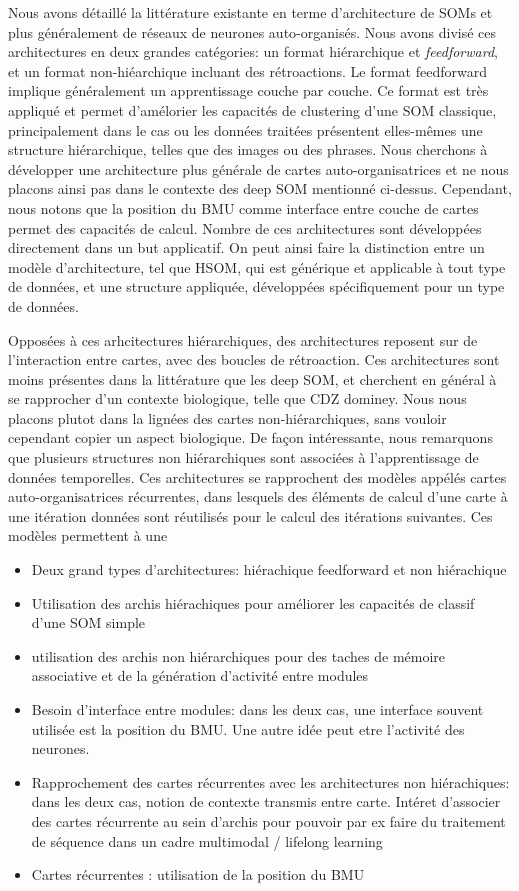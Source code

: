 \documentclass[../main]{subfiles}
\begin{document}
Nous avons détaillé la littérature existante en terme d'architecture de SOMs et plus généralement de réseaux de neurones auto-organisés. Nous avons divisé ces architectures en deux grandes catégories: un format hiérarchique et \emph{feedforward}, et un format non-hiéarchique incluant des rétroactions.
Le format feedforward implique généralement un apprentissage couche par couche. Ce format est très appliqué et permet d'amélorier les capacités de clustering d'une SOM classique, principalement dans le cas ou les données traitées présentent elles-mêmes une structure hiérarchique, telles que des images ou des phrases.
Nous cherchons à développer une architecture plus générale de cartes auto-organisatrices et ne nous placons ainsi pas dans le contexte des deep SOM mentionné ci-dessus. 
Cependant, nous notons que la position du BMU comme interface entre couche de cartes permet des capacités de calcul.
Nombre de ces architectures sont développées directement dans un but applicatif. On peut ainsi faire la distinction entre un modèle d'architecture, tel que HSOM, qui est générique et applicable à tout type de données, et une structure appliquée, développées spécifiquement pour un type de données.

Opposées à ces arhcitectures hiérarchiques, des architectures reposent sur de l'interaction entre cartes, avec des boucles de rétroaction.
Ces architectures sont moins présentes dans la littérature que les deep SOM, et cherchent en général à se rapprocher d'un contexte biologique, telle que CDZ dominey.
Nous nous placons plutot dans la lignées des cartes non-hiérarchiques, sans vouloir cependant copier un aspect biologique.
De façon intéressante, nous remarquons que plusieurs structures non hiérarchiques sont associées à l'apprentissage de données temporelles. Ces architectures se rapprochent des modèles appélés cartes auto-organisatrices récurrentes, dans lesquels des éléments de calcul d'une carte à une itération données sont réutilisés pour le calcul des itérations suivantes. Ces modèles permettent à une 


\begin{itemize}
    \item Deux grand types d'architectures: hiérachique feedforward et non hiérachique
    \item Utilisation des archis hiérachiques pour améliorer les capacités de classif d'une SOM simple
    \item utilisation des archis non hiérarchiques pour des taches de mémoire associative et de la génération d'activité entre modules
    \item Besoin d'interface entre modules: dans les deux cas, une interface souvent utilisée est la position du BMU. Une autre idée peut etre l'activité des neurones.
    \item Rapprochement des cartes récurrentes avec les architectures non hiérachiques: dans les deux cas, notion de contexte transmis entre carte. Intéret d'associer des cartes récurrente au sein d'archis pour pouvoir par ex faire du traitement de séquence dans un cadre multimodal / lifelong learning
    \item Cartes récurrentes : utilisation de la position du BMU
\end{itemize}
\end{document}

